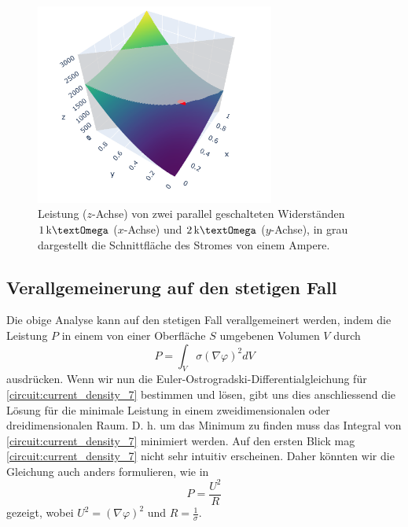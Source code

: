 \begin{figure}
\centering
\includegraphics[width=0.7\textwidth]{papers/circuit/two_parrallel_resistors.png}
\caption{Leistung ($z$-Achse) von zwei parallel geschalteten Widerständen
$1\,\text{k\textOmega}$ ($x$-Achse) und $2\,\text{k\textOmega}$ ($y$-Achse),
in grau dargestellt die Schnittfläche des Stromes von einem Ampere.}
\label{fig:circuit_power}
\end{figure}

\subsection{Verallgemeinerung auf den stetigen Fall}
Die obige Analyse kann auf den stetigen Fall verallgemeinert werden, indem die Leistung $P$ in einem von einer Oberfläche $S$ umgebenen Volumen $V$ durch 
\begin{equation}
	P=\int_V \sigma(\nabla \varphi)^2 d V
	\label{circuit:current_density_7}
\end{equation}
ausdrücken. Wenn wir nun die Euler-Ostrogradski-Differentialgleichung für \eqref{circuit:current_density_7} bestimmen und lösen, gibt uns dies anschliessend die Lösung für die minimale Leistung in einem zweidimensionalen oder dreidimensionalen Raum. D. h. um das Minimum zu finden muss das Integral von \eqref{circuit:current_density_7} minimiert werden. Auf den ersten Blick mag \eqref{circuit:current_density_7} nicht sehr intuitiv erscheinen. Daher könnten wir die Gleichung auch anders formulieren, wie in 
\begin{equation}
	P=\frac{U^2}{R}
	\label{circuit:current_density_8}
\end{equation}
gezeigt, wobei $U^2=\left( \nabla \varphi \right)^2$ und $R=\frac{1}{\sigma}$.





